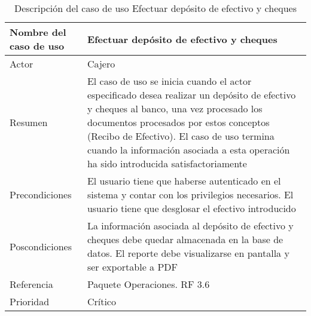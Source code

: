 \begin{table}[H]
	\sf
	\begin{supertabular}{|p{4.5cm}|p{12cm}|}
		\hline
		\textbf{Nombre del caso de uso}
		& \textbf{Efectuar depósito de efectivo y cheques} \\ \hline
		
		Actor
		& Cajero \\ \hline
		
		Resumen
		& El caso de uso se inicia cuando el actor especificado desea realizar un depósito de efectivo y cheques al banco, una vez procesado los documentos procesados por estos conceptos (Recibo de Efectivo). El caso de uso termina cuando la información asociada a esta operación ha sido introducida satisfactoriamente \\ \hline
		
		Precondiciones
		& El usuario tiene que haberse autenticado en el sistema y contar con los privilegios necesarios. El usuario tiene que desglosar el efectivo introducido \\ \hline
		
		Poscondiciones
		& La información asociada al depósito de efectivo y cheques debe quedar almacenada en la base de datos. El reporte debe visualizarse en pantalla y ser exportable a PDF \\ \hline
		
		Referencia
		& Paquete Operaciones. RF 3.6 \\ \hline
		
		Prioridad
		& Crítico \\		
		\hline
	\end{supertabular}
	\caption[Descripción del caso de uso Efectuar depósito de efectivo y cheques]{Descripción del caso de uso Efectuar depósito de efectivo y cheques}
	\label{table:CU_EfectDepEf}
\end{table}

